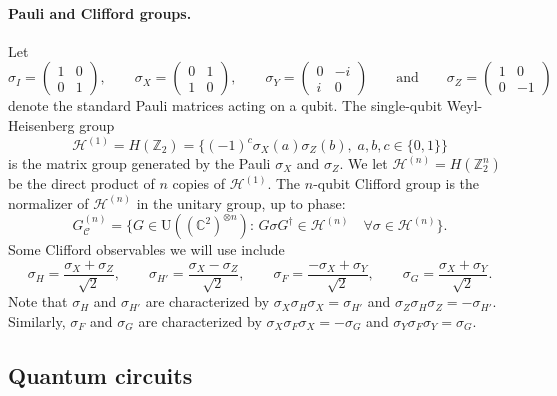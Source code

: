 \documentclass[11pt]{article}
\theoremstyle{remark}
\theoremstyle{definition}
\newcommand{\setft}[1]{\mathrm{#1}}
\newcommand{\Unitary}{\setft{U}}
\newcommand{\C}{\ensuremath{\mathbb{C}}}
\newcommand{\Z}{\ensuremath{\mathbb{Z}}}
\newcommand{\heisg}{{\mathcal{H}^{(1)}}}
\newcommand{\heisgn}{{\mathcal{H}^{(n)}}}
\newcommand{\cliffordn}{G_\mathcal{C}^{(n)}}
\begin{document}
\paragraph{Pauli and Clifford groups.}
Let 
\begin{equation}\label{eq:pauli-matrix}
\sigma_I = \begin{pmatrix} 1 & 0 \\ 0 & 1 \end{pmatrix},\qquad \sigma_X = \begin{pmatrix} 0 & 1 \\ 1 & 0 \end{pmatrix},\qquad \sigma_Y = \begin{pmatrix} 0 & -i \\ i & 0 \end{pmatrix}\qquad\text{and}\qquad \sigma_Z = \begin{pmatrix} 1 & 0 \\ 0 & -1\end{pmatrix}
\end{equation}
denote the standard Pauli matrices acting on a qubit.  The single-qubit Weyl-Heisenberg group
$$\heisg = H(\Z_2)=\Big\{(-1)^c\sigma_X(a)\sigma_Z(b),\;a,b,c\in\{0,1\}\Big\} $$
is the matrix group generated by the Pauli $\sigma_X$ and $\sigma_Z$. We let $\heisgn = H(\Z_2^n)$ be the direct product of $n$ copies of $\heisg$.  
The $n$-qubit Clifford group is the normalizer of $\heisgn$ in the unitary group, up to phase: 
$$\cliffordn = \big\{G\in\Unitary((\C^2)^{\otimes n}):\, G \sigma G^\dagger \in \heisgn \quad\forall \sigma \in \heisgn\big\}.$$
Some Clifford observables we will use include 
\begin{equation}\label{eq:pauli-matrix-2}
 \sigma_H = \frac{\sigma_X+\sigma_Z}{\sqrt{2}},\qquad \sigma_{H'} = \frac{\sigma_X-\sigma_Z}{\sqrt{2}},\qquad \sigma_F = \frac{-\sigma_X+\sigma_Y}{\sqrt{2}},\qquad \sigma_{G} = \frac{\sigma_X+\sigma_Y}{\sqrt{2}}.
\end{equation}
Note that  $\sigma_H$ and $\sigma_{H'}$ are characterized by $\sigma_X \sigma_H \sigma_X = \sigma_{H'}$ and $\sigma_Z \sigma_H \sigma_Z = -\sigma_{H'}$. Similarly, $\sigma_F$ and $\sigma_G$ are characterized by $\sigma_X \sigma_F \sigma_X = -\sigma_G$ and $\sigma_Y \sigma_F \sigma_Y = \sigma_G$. 



\subsection{Quantum circuits} 
\end{document}
